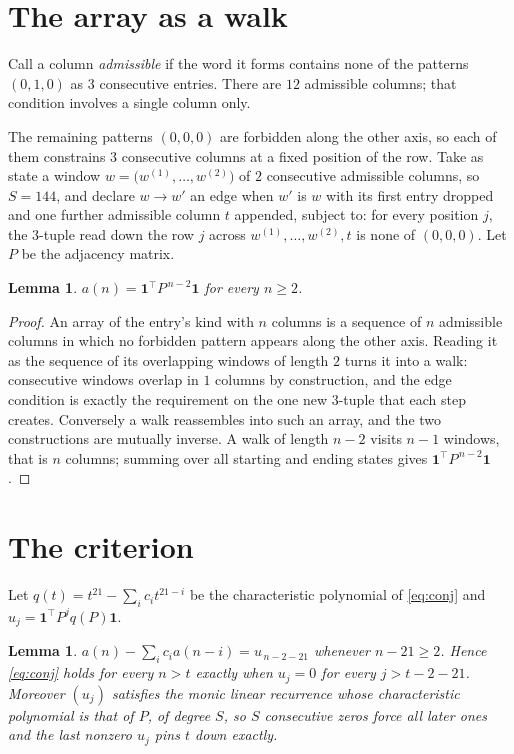 \documentclass[11pt,a4paper]{article}
\theoremstyle{plain}
\newtheorem{lemma}[theorem]{Lemma}
\theoremstyle{definition}
\begin{document}
\section{The array as a walk}

Call a column \emph{admissible} if the word it forms contains none of the patterns
$(0,1,0)$ as $3$ consecutive entries. There are $12$ admissible columns; that condition
involves a single column only.

The remaining patterns $(0,0,0)$ are forbidden along the other axis, so each of them
constrains $3$ consecutive columns at a fixed position of the row. Take as state a
window $w=\bigl(w^{(1)},\dots,w^{(2)}\bigr)$ of $2$ consecutive admissible
columns, so $S=144$, and declare $w\to w'$ an edge when $w'$ is $w$ with its first entry
dropped and one further admissible column $t$ appended, subject to: for every position
$j$, the $3$-tuple read down the row $j$ across $w^{(1)},\dots,w^{(2)},t$
is none of $(0,0,0)$. Let $P$ be the adjacency matrix.

\begin{lemma}\label{lem:walk}
$a(n)=\mathbf{1}^{\!\top}P^{\,n-2}\mathbf{1}$ for every $n\ge2$.
\end{lemma}

\begin{proof}
An array of the entry's kind with $n$ columns is a sequence of $n$ admissible columns in
which no forbidden pattern appears along the other axis. Reading it as the sequence of its
overlapping windows of length $2$ turns it into a walk: consecutive windows overlap in
$1$ columns by construction, and the edge condition is exactly the requirement on the one
new $3$-tuple that each step creates. Conversely a walk reassembles into such an array,
and the two constructions are mutually inverse. A walk of length $n-2$ visits $n-1$
windows, that is $n$ columns; summing over all starting and ending states gives
$\mathbf{1}^{\!\top}P^{\,n-2}\mathbf{1}$.
\end{proof}

\section{The criterion}

Let $q(t)=t^{21}-\sum_i c_i t^{21-i}$ be the characteristic polynomial of
\eqref{eq:conj} and $u_j=\mathbf{1}^{\!\top}P^{j}q(P)\mathbf{1}$.

\begin{lemma}\label{lem:crit}
$a(n)-\sum_i c_i a(n-i)=u_{\,n-2-21}$ whenever $n-21\ge2$. Hence
\eqref{eq:conj} holds for every $n>t$ exactly when $u_j=0$ for every
$j>t-2-21$. Moreover $(u_j)$ satisfies the monic linear recurrence whose
characteristic polynomial is that of $P$, of degree $S$, so $S$ consecutive zeros force all
later ones and the last nonzero $u_j$ pins $t$ down exactly.
\end{lemma}
\end{document}
